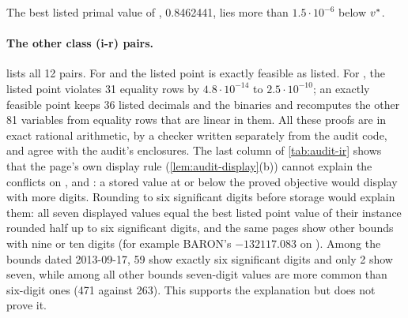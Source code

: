 \begin{certbox}
\end{certbox}

The best listed primal value of , 0.8462441, lies more than $1.5\cdot10^{-6}$ below $v^{*}$.

\paragraph{The other class (i-r) pairs.}
 lists all 12 pairs.
For  and  the listed point is exactly feasible as listed.
For , the listed point violates 31 equality rows by $4.8\cdot10^{-14}$ to $2.5\cdot10^{-10}$; an exactly feasible point keeps 36 listed decimals and the binaries and recomputes the other 81 variables from equality rows that are linear in them.
All these proofs are in exact rational arithmetic, by a checker written separately from the audit code, and agree with the audit's enclosures.
The last column of \cref{tab:audit-ir} shows that the page's own display rule (\cref{lem:audit-display}(b)) cannot explain the conflicts on ,  and : a stored value at or below the proved objective would display with more digits.
Rounding to six significant digits before storage would explain them: all seven displayed values equal the best listed point value of their instance rounded half up to six significant digits, and the same pages show other bounds with nine or ten digits (for example BARON's $-132117.083$ on ).
Among the bounds dated 2013-09-17, 59 show exactly six significant digits and only 2 show seven, while among all other bounds seven-digit values are more common than six-digit ones (471 against 263).
This supports the explanation but does not prove it.

